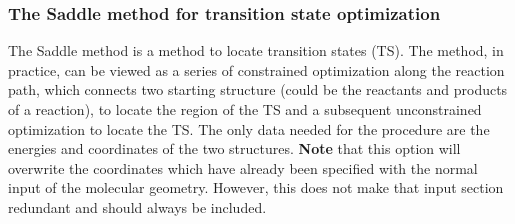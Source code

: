 \subsubsection{The Saddle method for transition state optimization}
The Saddle method \cite{Saddle_method} is a method to locate transition states (TS). The method, in practice, can be viewed as a
series of constrained optimization along the reaction path, which connects two starting structure (could be
the reactants and products of a reaction), to locate the region of the TS and a subsequent unconstrained optimization
to locate the TS. The only data needed for the procedure are the energies and coordinates of the two structures.
{\bf Note} that this option will overwrite the
coordinates which have already been specified with the normal input of the molecular geometry. However, this does
not make that input section redundant and should always be included.

